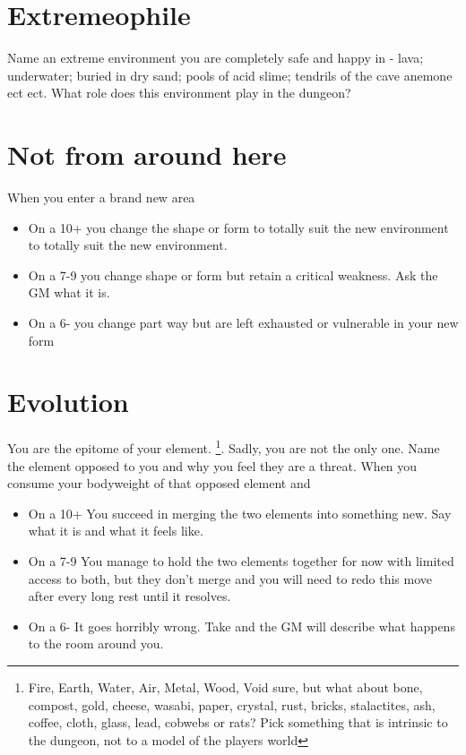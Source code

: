 \documentclass{tufte-book}
\begin{document}
\section{Extremeophile} 
Name an extreme environment you are completely safe and happy in - lava; underwater; buried in dry sand; pools of acid slime; tendrils of the cave anemone ect ect. What role does this environment play in the dungeon?

\section{Not from around here} 
When you enter a brand new area 
\begin{itemize} 
\item On a 10+ you change the shape or form to totally suit the new environment to totally suit the new environment.
\item On a 7-9 you change shape or form but retain a critical weakness. Ask the GM what it is.
\item On a 6- you change part way but are left exhausted or vulnerable in your new form
\end{itemize}

\section{Evolution} 
You are the epitome of your element. \footnote{Fire, Earth, Water, Air, Metal, Wood, Void sure, but what about bone, compost, gold, cheese, wasabi, paper, crystal, rust, bricks, stalactites, ash, coffee, cloth, glass, lead, cobwebs or rats? Pick something that is intrinsic to the dungeon, not to a model of the players world }. Sadly, you are not the only one. Name the element opposed to you and why you feel they are a threat.
When you consume your bodyweight of that opposed element  and 
\begin{itemize}
\item On a 10+ You succeed in merging the two elements into something new. Say what it is and what it feels like.
\item On a 7-9 You manage to hold the two elements together for now with limited access to both, but they don't merge and you will need to redo this move after every long rest until it resolves.
\item On a 6- It goes horribly wrong. Take  and the GM will describe what happens to the room around you.
 \end{itemize}
\end{document}

